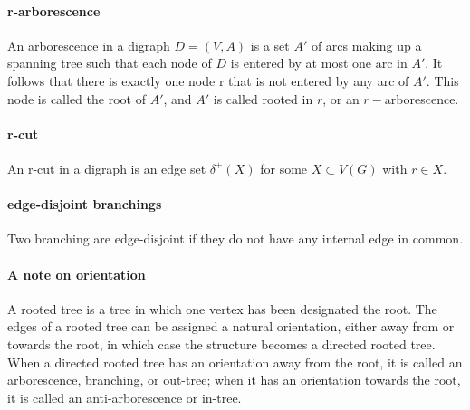 \documentclass{article}
\begin{document}
\paragraph{r-arborescence}
An arborescence in a digraph $D = (V, A)$ is a set $A'$ of arcs making up a spanning tree 
such that each node of $D$ is entered by at most one arc in $A'$. 
It follows that there is exactly one node r that is not
entered by any arc of $A'$. This node is called the root of $A'$, and $A'$ is called
rooted in $r$, or an $r-$arborescence.

\paragraph{r-cut}
An r-cut in a digraph is an edge set $\delta^+(X)$ for some $X \subset V(G)$ with $r \in X$.

\paragraph{edge-disjoint branchings}
Two branching are edge-disjoint if they do not have any internal edge in common.

\paragraph{A note on orientation}
A rooted tree is a tree in which one vertex has been designated the root.
The edges of a rooted tree can be assigned a natural orientation, either away from 
or towards the root, in which case the structure becomes a directed rooted tree.
When a directed rooted tree has an orientation away from the root,
it is called an arborescence, branching, or out-tree;
when it has an orientation towards the root, 
it is called an anti-arborescence or in-tree.



\end{document}
